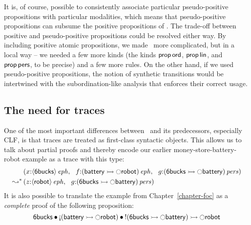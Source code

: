It is, of course, possible to consistently associate particular
pseudo-positive propositions with particular modalities, which means
that pseudo-positive propositions can subsume the positive
propositions of \sls. The trade-off between positive and
pseudo-positive propositions could be resolved either way. By
including positive atomic propositions, we made \sls~more complicated,
but in a local way -- we needed a few more kinds (the kinds ${\sf
  prop\,ord}$, ${\sf prop\,lin}$, and ${\sf prop\,pers}$, to be
precise) and a few more rules. On the other hand, if we used
pseudo-positive propositions, the notion of synthetic transitions
would be intertwined with the subordination-like analysis that
enforces their correct usage.

\subsection{The need for traces}
\label{sec:whytraces}

One of the most important differences between \sls~and its
predecessors, especially CLF, is that traces are treated as
first-class syntactic objects. This allows us to talk about 
partial proofs and thereby encode our earlier 
money-store-battery-robot example as a trace with this type:
\begin{align*}
& \left(
 x{:}{\langle {\sf 6bucks} \rangle}\,{{\it eph}}, ~~
 f{:}{({\sf battery} \rightarrowtail {\ocircle}{\sf robot})}\,{{\it eph}}, ~~
 g{:}{({\sf 6bucks} \rightarrowtail {\ocircle}{\sf battery})}\,{{\it pers}}
\right)
\\
\leadsto^* &
\left(
 z{:}{\langle {\sf robot} \rangle}\,{{\it eph}}, ~~
 g{:}{({\sf 6bucks} \rightarrowtail {\ocircle}{\sf battery})}\,{{\it pers}}
\right)
\end{align*}
It is also possible to translate the example from Chapter~\ref{chapter-foc}
as a {\it complete} proof of the following proposition:
\[
  {\sf 6bucks} 
      \fuse {\gnab}({\sf battery} \lefti {\ocircle}{\sf robot})
      \fuse {!}({\sf 6bucks} \lefti {\ocircle}{\sf battery})
     \lefti
     {\ocircle}{\sf robot}
\]

